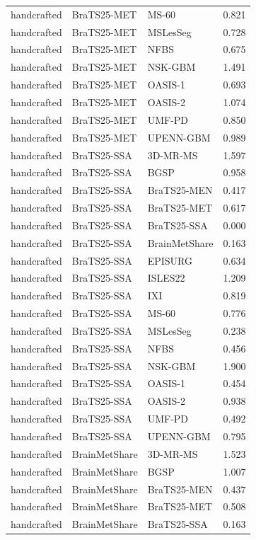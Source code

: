 \begin{tabular}{lllr}
handcrafted & BraTS25-MET & MS-60 & 0.821 \\
handcrafted & BraTS25-MET & MSLesSeg & 0.728 \\
handcrafted & BraTS25-MET & NFBS & 0.675 \\
handcrafted & BraTS25-MET & NSK-GBM & 1.491 \\
handcrafted & BraTS25-MET & OASIS-1 & 0.693 \\
handcrafted & BraTS25-MET & OASIS-2 & 1.074 \\
handcrafted & BraTS25-MET & UMF-PD & 0.850 \\
handcrafted & BraTS25-MET & UPENN-GBM & 0.989 \\
handcrafted & BraTS25-SSA & 3D-MR-MS & 1.597 \\
handcrafted & BraTS25-SSA & BGSP & 0.958 \\
handcrafted & BraTS25-SSA & BraTS25-MEN & 0.417 \\
handcrafted & BraTS25-SSA & BraTS25-MET & 0.617 \\
handcrafted & BraTS25-SSA & BraTS25-SSA & 0.000 \\
handcrafted & BraTS25-SSA & BrainMetShare & 0.163 \\
handcrafted & BraTS25-SSA & EPISURG & 0.634 \\
handcrafted & BraTS25-SSA & ISLES22 & 1.209 \\
handcrafted & BraTS25-SSA & IXI & 0.819 \\
handcrafted & BraTS25-SSA & MS-60 & 0.776 \\
handcrafted & BraTS25-SSA & MSLesSeg & 0.238 \\
handcrafted & BraTS25-SSA & NFBS & 0.456 \\
handcrafted & BraTS25-SSA & NSK-GBM & 1.900 \\
handcrafted & BraTS25-SSA & OASIS-1 & 0.454 \\
handcrafted & BraTS25-SSA & OASIS-2 & 0.938 \\
handcrafted & BraTS25-SSA & UMF-PD & 0.492 \\
handcrafted & BraTS25-SSA & UPENN-GBM & 0.795 \\
handcrafted & BrainMetShare & 3D-MR-MS & 1.523 \\
handcrafted & BrainMetShare & BGSP & 1.007 \\
handcrafted & BrainMetShare & BraTS25-MEN & 0.437 \\
handcrafted & BrainMetShare & BraTS25-MET & 0.508 \\
handcrafted & BrainMetShare & BraTS25-SSA & 0.163 \\

\end{tabular}
